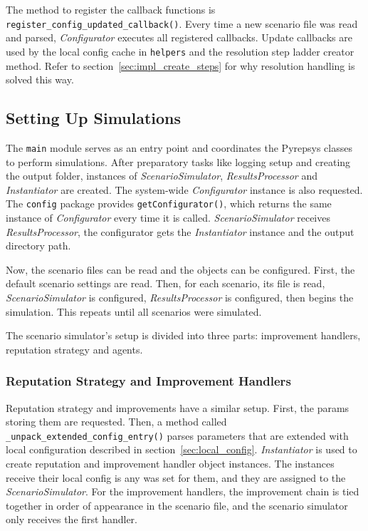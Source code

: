\documentclass[%
    ]{\PathToTumTemplate/thesis/tum_thesis}
\begin{document}
The method to register the callback functions is \lstinline{register_config_updated_callback()}.
Every time a new scenario file was read and parsed, \emph{Configurator} executes all registered callbacks.
Update callbacks are used by the local config cache in \texttt{helpers} and the resolution step ladder creator method.
Refer to section~\ref{sec:impl_create_steps} for why resolution handling is solved this way.


\subsection{Setting Up Simulations}
The \texttt{main} module serves as an entry point and coordinates the Pyrepsys classes to perform simulations.
After preparatory tasks like logging setup and creating the output folder, instances of \emph{ScenarioSimulator}, \emph{ResultsProcessor} and \emph{Instantiator} are created.
The system-wide \emph{Configurator} instance is also requested.
The \texttt{config} package provides \lstinline{getConfigurator()}, which returns the same instance of \emph{Configurator} every time it is called.
\emph{ScenarioSimulator} receives \emph{ResultsProcessor}, the configurator gets the \emph{Instantiator} instance and the output directory path.

Now, the scenario files can be read and the objects can be configured.
First, the default scenario settings are read.
Then, for each scenario, its file is read, \emph{ScenarioSimulator} is configured, \emph{ResultsProcessor} is configured, then begins the simulation.
This repeats until all scenarios were simulated.

The scenario simulator's setup is divided into three parts: improvement handlers, reputation strategy and agents.

\subsubsection{Reputation Strategy and Improvement Handlers}
Reputation strategy and improvements have a similar setup.
First, the params storing them are requested.
Then, a method called \lstinline{_unpack_extended_config_entry()} parses parameters that are extended with local configuration described in section~\ref{sec:local_config}.
\emph{Instantiator} is used to create reputation and improvement handler object instances.
The instances receive their local config is any was set for them, and they are assigned to the \emph{ScenarioSimulator}.
For the improvement handlers, the improvement chain is tied together in order of appearance in the scenario file, and the scenario simulator only receives the first handler.
\end{document}
